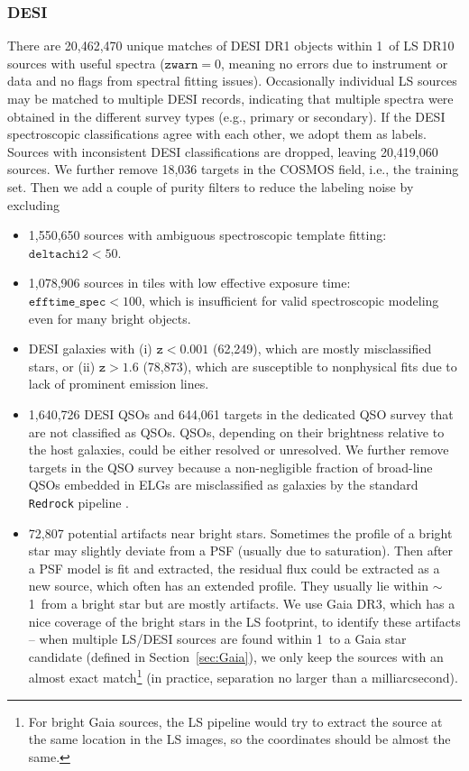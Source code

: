 \documentclass[twocolumn,tighten]{aastex631}
\newcommand{\dr}[1]{DR{#1}}
\begin{document}
\begin{CJK*}{UTF8}{gbsn}
\subsubsection{DESI}\label{sec:DESI}
There are 20,462,470 unique matches of DESI \dr{1} objects within 1\arcsec\ of LS \dr{10} sources with useful spectra ($\texttt{zwarn}=0$, meaning no errors due to instrument or data and no flags from spectral fitting issues). Occasionally individual LS sources may be matched to multiple DESI records, indicating that multiple spectra were obtained in the different survey types (e.g., primary or secondary). If the DESI spectroscopic classifications agree with each other, we adopt them as labels. Sources with inconsistent DESI classifications are dropped, leaving 20,419,060 sources. We further remove 18,036 targets in the COSMOS field, i.e., the training set. Then we add a couple of purity filters to reduce the labeling noise by excluding
\begin{itemize}
    \item 1,550,650 sources with ambiguous spectroscopic template fitting: $\texttt{deltachi2} < 50$.
    \item 1,078,906 sources in tiles with low effective exposure time: $\texttt{efftime\_spec} < 100$, which is insufficient for valid spectroscopic modeling even for many bright objects.
    \item DESI galaxies with (i) $\texttt{z}<0.001$ (62,249), which are mostly misclassified stars, or (ii) $\texttt{z}>1.6$ (78,873), which are susceptible to nonphysical fits due to lack of prominent emission lines.
    \item 1,640,726 DESI QSOs and 644,061 targets in the dedicated QSO survey that are not classified as QSOs. QSOs, depending on their brightness relative to the host galaxies, could be either resolved or unresolved. We further remove targets in the QSO survey because a non-negligible fraction of broad-line QSOs embedded in ELGs are misclassified as galaxies by the standard \texttt{Redrock} pipeline \citep{DESI_QSO_VI_2023}.
    \item 72,807 potential artifacts near bright stars. Sometimes the profile of a bright star may slightly deviate from a PSF (usually due to saturation). Then after a PSF model is fit and extracted, the residual flux could be extracted as a new source, which often has an extended profile. They usually lie within $\sim$1\arcsec\ from a bright star but are mostly artifacts. We use Gaia \dr{3}, which has a nice coverage of the bright stars in the LS footprint, to identify these artifacts -- when multiple LS/DESI sources are found within 1\arcsec\ to a Gaia star candidate (defined in Section~\ref{sec:Gaia}), we only keep the sources with an almost exact match\footnote{For bright Gaia sources, the LS pipeline would try to extract the source at the same location in the LS images, so the coordinates should be almost the same.} (in practice, separation no larger than a milliarcsecond).

\end{itemize}
\end{CJK*}
\end{document}
